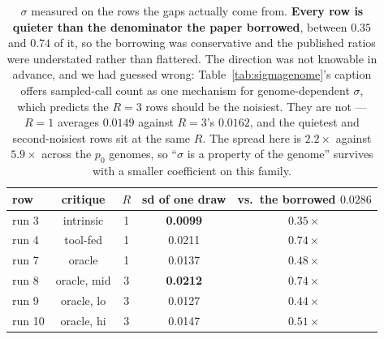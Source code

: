 \documentclass[11pt]{article}
\begin{document}
\begin{table}[h]
\centering
\small
\begin{tabular}{lcccc}
\toprule
row & critique & $R$ & sd of one draw & vs.\ the borrowed $0.0286$ \\
\midrule
run 3  & intrinsic          & 1 & \textbf{0.0099} & $0.35\times$ \\
run 4  & tool-fed           & 1 & 0.0211 & $0.74\times$ \\
run 7  & oracle             & 1 & 0.0137 & $0.48\times$ \\
run 8  & oracle, mid        & 3 & \textbf{0.0212} & $0.74\times$ \\
run 9  & oracle, lo         & 3 & 0.0127 & $0.44\times$ \\
run 10 & oracle, hi         & 3 & 0.0147 & $0.51\times$ \\
\bottomrule
\end{tabular}
\caption{$\sigma$ measured on the rows the gaps actually come from. \textbf{Every row is quieter
than the denominator the paper borrowed}, between $0.35$ and $0.74$ of it, so the borrowing was
conservative and the published ratios were understated rather than flattered. The direction was
not knowable in advance, and we had guessed wrong: Table~\ref{tab:sigmagenome}'s caption offers
sampled-call count as one mechanism for genome-dependent $\sigma$, which predicts the $R{=}3$ rows
should be the noisiest. They are not --- $R{=}1$ averages $0.0149$ against $R{=}3$'s $0.0162$, and
the quietest and second-noisiest rows sit at the same $R$. The spread here is $2.2\times$ against
$5.9\times$ across the $p_0$ genomes, so ``$\sigma$ is a property of the genome'' survives with a
smaller coefficient on this family.}
\label{tab:curvesigma}
\end{table}
\end{document}
